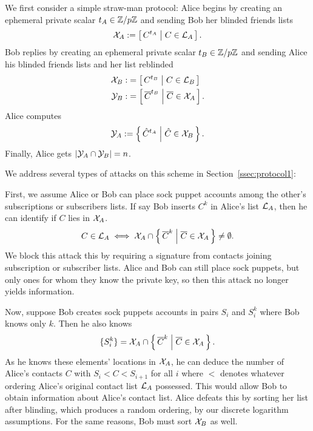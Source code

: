 \documentclass{article}
\begin{document}
We first consider a simple straw-man protocol:
Alice begins by creating an ephemeral private scalar $t_A \in \mathbb{Z}/p\mathbb{Z}$
and sending Bob her blinded friends lists
\begin{equation}
  {\cal X}_A := %
  \Listst{ C^{t_A} }{ C \in {\cal L}_A }
  \mathperiod
\end{equation}
Bob replies by creating an ephemeral private scalar $t_B \in \mathbb{Z}/p\mathbb{Z}$
and sending Alice his blinded friends lists and her list reblinded
\begin{align}
  {\cal X}_B :&= %
  \Listst{ C^{t_B} }{ C \in {\cal L}_B }  \\
  {\cal Y}_B :&= %
  \Listst{ \overline{C}^{t_B} }{ \overline{C} \in {\cal X}_A }
  \mathperiod
\end{align}
Alice computes
\begin{equation}
  {\cal Y}_A :=
  \Setst{ \hat{C}^{t_A}}{ \hat{C} \in {\cal X}_B }
  \mathperiod
\end{equation}
Finally, Alice gets $|{\cal Y}_A \cap {\cal Y}_B| = n$.

We address several types of attacks on this scheme
 in Section~\ref{ssec:protocol1}:

First, we assume Alice or Bob can place sock puppet accounts among
the other's subscriptions or subscribers lists.
If say Bob inserts $C^k$ in Alice's list ${\cal L}_A$, then
he can identify if $C$ lies in ${\cal X}_A$. %
\begin{equation}
   C \in {\cal L}_A \iff
   {\cal X}_A \cap
   \Setst{ \overline{C}^k }{ \overline{C} \in {\cal X}_A}
   \neq \emptyset
  \mathperiod
\end{equation}
We block this attack this by requiring a signature from contacts
joining subscription or subscriber lists.  Alice and Bob can still
place sock puppets, but only ones for whom they know the private
key, so then this attack no longer yields information.

Now, suppose Bob creates sock puppets accounts in pairs $S_i$ and $S_i^k$ where
Bob knows only $k$.  Then he also knows
\begin{equation}
   \{ S_i^k \} =
   {\cal X}_A \cap
   \Setst{ \overline{C}^k }{ \overline{C} \in {\cal X}_A }
  \mathperiod
\end{equation}
As he knows these elements' locations in ${\cal X}_A$,
he can deduce the number of Alice's contacts $C$ with
$S_i < C < S_{i+1}$ for all $i$ where $<$ denotes whatever
ordering Alice's original contact list ${\cal L}_A$ possessed.
This would allow Bob to obtain information
 about Alice's contact list.
Alice defeats this by sorting her list after blinding, which
produces a random ordering, by our discrete logarithm assumptions.
For the same reasons, Bob must sort ${\cal X}_B$ as well.
\end{document}
